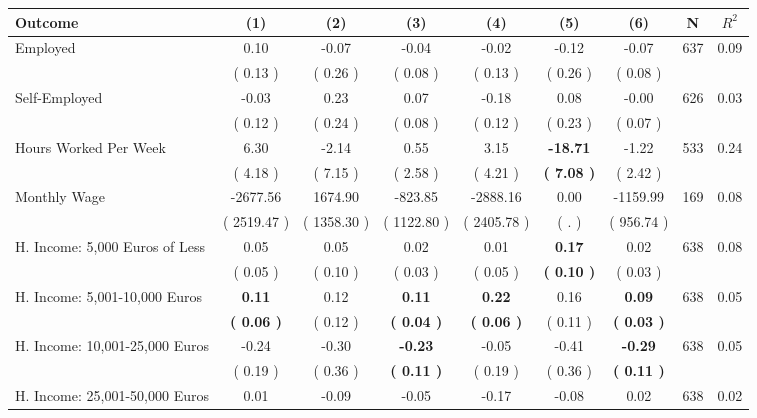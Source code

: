 \begin{tabular}{lcccccccc}
\toprule
 \textbf{Outcome} & \textbf{(1)} & \textbf{(2)} & \textbf{(3)} & \textbf{(4)} & \textbf{(5)} & \textbf{(6)} & \textbf{N} & \textbf{$ R^2$} \\
\midrule
Employed &      0.10 &     -0.07 &     -0.04 &     -0.02 &     -0.12 &     -0.07 & 637 &       0.09 \\ 
 & (     0.13 ) & (     0.26 ) & (     0.08 ) & (     0.13 ) & (     0.26 ) & (     0.08 ) & \\
Self-Employed &     -0.03 &      0.23 &      0.07 &     -0.18 &      0.08 &     -0.00 & 626 &       0.03 \\ 
 & (     0.12 ) & (     0.24 ) & (     0.08 ) & (     0.12 ) & (     0.23 ) & (     0.07 ) & \\
Hours Worked Per Week &      6.30 &     -2.14 &      0.55 &      3.15 & \textbf{   -18.71} &     -1.22 & 533 &       0.24 \\ 
 & (     4.18 ) & (     7.15 ) & (     2.58 ) & (     4.21 ) & \textbf{(     7.08 )} & (     2.42 ) & \\
Monthly Wage &  -2677.56 &   1674.90 &   -823.85 &  -2888.16 &      0.00 &  -1159.99 & 169 &       0.08 \\ 
 & (  2519.47 ) & (  1358.30 ) & (  1122.80 ) & (  2405.78 ) & (        . ) & (   956.74 ) & \\
H. Income: 5,000 Euros of Less &      0.05 &      0.05 &      0.02 &      0.01 & \textbf{     0.17} &      0.02 & 638 &       0.08 \\ 
 & (     0.05 ) & (     0.10 ) & (     0.03 ) & (     0.05 ) & \textbf{(     0.10 )} & (     0.03 ) & \\
H. Income: 5,001-10,000 Euros & \textbf{     0.11} &      0.12 & \textbf{     0.11} & \textbf{     0.22} &      0.16 & \textbf{     0.09} & 638 &       0.05 \\ 
 & \textbf{(     0.06 )} & (     0.12 ) & \textbf{(     0.04 )} & \textbf{(     0.06 )} & (     0.11 ) & \textbf{(     0.03 )} & \\
H. Income: 10,001-25,000 Euros &     -0.24 &     -0.30 & \textbf{    -0.23} &     -0.05 &     -0.41 & \textbf{    -0.29} & 638 &       0.05 \\ 
 & (     0.19 ) & (     0.36 ) & \textbf{(     0.11 )} & (     0.19 ) & (     0.36 ) & \textbf{(     0.11 )} & \\
H. Income: 25,001-50,000 Euros &      0.01 &     -0.09 &     -0.05 &     -0.17 &     -0.08 &      0.02 & 638 &       0.02 \\ 

\end{tabular}
